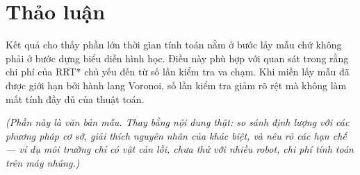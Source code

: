 
\section{Thảo luận}

Kết quả cho thấy phần lớn thời gian tính toán nằm ở bước lấy mẫu chứ không
phải ở bước dựng biểu diễn hình học. Điều này phù hợp với quan sát trong
\cite{karnik2021} rằng chi phí của RRT* chủ yếu đến từ số lần kiểm tra va
chạm. Khi miền lấy mẫu đã được giới hạn bởi hành lang Voronoi, số lần kiểm
tra giảm rõ rệt mà không làm mất tính đầy đủ của thuật toán.

\emph{(Phần này là văn bản mẫu. Thay bằng nội dung thật: so sánh định lượng
với các phương pháp cơ sở, giải thích nguyên nhân của khác biệt, và nêu rõ
các hạn chế — ví dụ môi trường chỉ có vật cản lồi, chưa thử với nhiều robot,
chi phí tính toán trên máy nhúng.)}
